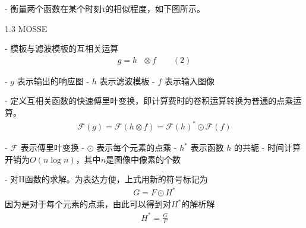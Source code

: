 - 衡量两个函数在某个时刻τ的相似程度，如下图所示。


1.3 MOSSE



- 模板与滤波模板的互相关运算
\begin{align}
g=h\text{ }\otimes  f \qquad (2)
\end{align}

- $g$ 表示输出的响应图
- $h$ 表示滤波模板
- $f$ 表示输入图像

- 定义互相关函数的快速傅里叶变换，即计算费时的卷积运算转换为普通的点乘运算。
\begin{align}
\mathcal{F}(g) = \mathcal{F}(h\otimes f)={{\mathcal{F}(h)}^{*}}\odot \mathcal{F}(f )
\end{align}

- $\mathcal{F}$ 表示傅里叶变换
- $\odot$ 表示每个元素的点乘
- $h^*$ 表示函数 $h$ 的共轭
- 时间计算开销为$O(n\log n)$，其中$n$是图像中像素的个数

- 对H函数的求解。为表达方便，上式用新的符号标记为
\begin{align}
G=F\odot H^*
\end{align}
因为是对于每个元素的点乘，由此可以得到对$H^*$的解析解
\begin{align}
H^* = \frac{G}{F}
\end{align}

